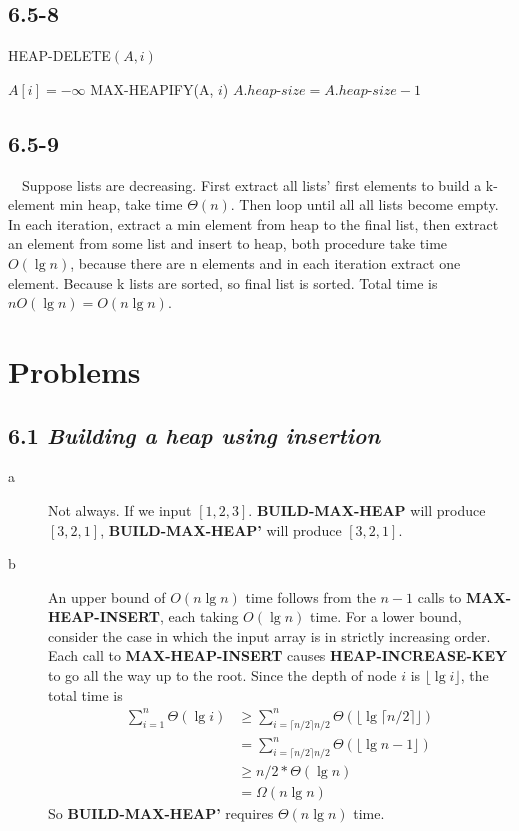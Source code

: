 \documentclass{article}
\begin{document}
\subsection*{6.5-8}
\begin{algorithm}
\caption{HEAP-DELETE$(A, i)$}
\begin{algorithmic}[1]
\STATE $A[i] = -\infty$
\STATE MAX-HEAPIFY(A, $i$)
\STATE $A.heap\textrm{-}size = A.heap\textrm{-}size - 1$
\end{algorithmic}
\end{algorithm}



\subsection*{6.5-9}
~~Suppose lists are decreasing. First extract all lists' first elements to build a k-element min heap, take time $\Theta(n)$. Then loop until all all lists become empty. In each iteration, extract a min element from heap to the final list, then extract an element from some list and insert to heap, both procedure take time $O(\lg n)$, because there are n elements and in each iteration extract one element. Because k lists are sorted, so final list is sorted. Total time is $nO(\lg n) = O(n\lg n)$.

\section*{Problems}
\subsection*{6.1 \textit{\textbf{Building a heap using insertion}}}
\begin{description}
\item[a] Not always. If we input $[1, 2, 3]$. \textbf{BUILD-MAX-HEAP} will produce $[3, 2, 1]$, \textbf{BUILD-MAX-HEAP'} will produce $[3, 2, 1]$.
\item[b] An upper bound of $O(n\lg n)$ time follows from the $n-1$ calls to \textbf{MAX-HEAP-INSERT}, each taking $O(\lg n)$ time. For a lower bound, consider the case in which the input array is in strictly increasing order. Each call to \textbf{MAX-HEAP-INSERT} causes \textbf{HEAP-INCREASE-KEY} to go all the way up to the root. Since the depth of node $i$ is $\lfloor {\lg i} \rfloor$, the total time is
  \begin{align*}
    \sum_{i=1}^n\Theta(\lg i) &\ge \sum_{i=\lceil {n/2} \rceil {n/2}}^n\Theta(\lfloor {  \lg \lceil {n/2} \rceil \rfloor}) \\
                              & = \sum_{i=\lceil {n/2} \rceil {n/2}}^n\Theta(\lfloor {\lg{n} - 1} \rfloor) \\
                              & \ge n/2*\Theta(\lg n)\\
                              & = \Omega(n\lg n)
  \end{align*}
  So \textbf{BUILD-MAX-HEAP'} requires $\Theta(n\lg n)$ time.
\end{description}
\end{document}
